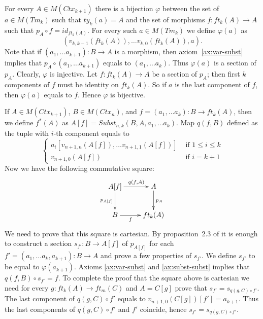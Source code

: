 \documentclass[reqno]{amsart}
\theoremstyle{definition}
\theoremstyle{remark}
\numberwithin{figure}{section}
\begin{document}
For every $A \in M(Ctx_{k+1})$ there is a bijection $\varphi$ between the set of $a \in M(Tm_k)$ such that $ty_k(a) = A$ and the set of morphisms $f : ft_k(A) \to A$ such that $p_A \circ f = id_{ft_k(A)}$.
For every such $a \in M(Tm_k)$ we define $\varphi(a)$ as
\[ (v_{k,k-1}(ft_k(A)), \ldots v_{k,0}(ft_k(A)), a). \]
Note that if $(a_1, \ldots a_{k+1}) : B \to A$ is a morphism, then axiom~\eqref{ax:var-subst} implies that $p_A \circ (a_1, \ldots a_{k+1})$ equals to $(a_1, \ldots a_k)$.
Thus $\varphi(a)$ is a section of $p_A$.
Clearly, $\varphi$ is injective.
Let $f : ft_k(A) \to A$ be a section of $p_A$; then first $k$ components of $f$ must be identity on $ft_k(A)$.
So if $a$ is the last component of $f$, then $\varphi(a)$ equals to $f$.
Hence $\varphi$ is bijective.

If $A \in M(Ctx_{k+1})$, $B \in M(Ctx_n)$, and $f = (a_1, \ldots a_k) : B \to ft_k(A)$, then we define $f^*(A)$ as $A[f] = Subst_{n,k}(B, A, a_1, \ldots a_k)$.
Map $q(f,B)$ defined as the tuple with $i$-th component equals to
\[ \left\{
  \begin{array}{lr}
    a_i[v_{n+1,n}(A[f]), \ldots v_{n+1,1}(A[f])] & \text{ if } 1 \leq i \leq k \\
    v_{n+1,0}(A[f])                              & \text{ if } i = k+1
  \end{array}
\right. \]
Now we have the following commutative square:
\[ \xymatrix{ A[f] \ar[r]^-{q(f,A)} \ar[d]_{p_{A[f]}} & A \ar[d]^{p_A} \\
              B \ar[r]_-f                             & ft_k(A)
            } \]
We need to prove that this square is cartesian.
By proposition~2.3 of \cite{c-systems} it is enough to construct a section $s_{f'} : B \to A[f]$ of $p_{A[f]}$ for each $f' = (a_1, \ldots a_k, a_{k+1}) : B \to A$ and prove a few properties of $s_{f'}$.
We define $s_{f'}$ to be equal to $\varphi(a_{k+1})$.
Axioms \eqref{ax:var-subst} and \eqref{ax:subst-subst} implies that $q(f, B) \circ s_{f'} = f$.
To complete the proof that the square above is cartesian we need for every $g : ft_k(A) \to ft_m(C)$ and $A = C[g]$ prove that $s_{f'} = s_{q(g,C) \circ f'}$.
The last component of $q(g,C) \circ f'$ equals to $v_{n+1,0}(C[g])[f'] = a_{k+1}$.
Thus the last components of $q(g,C) \circ f'$ and $f'$ coincide, hence $s_{f'} = s_{q(g,C) \circ f'}$.
\end{document}
